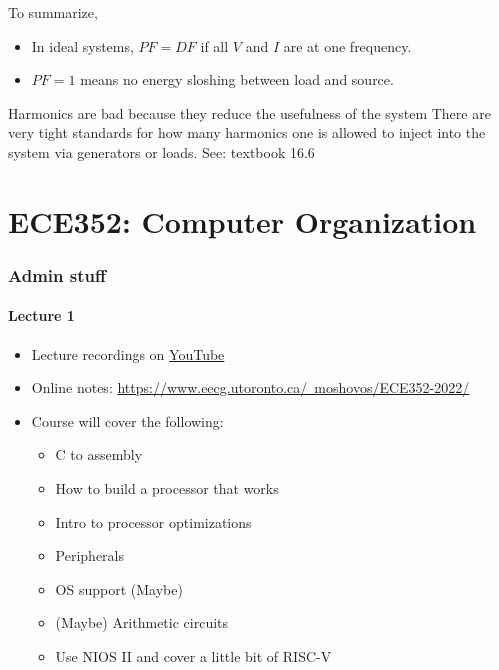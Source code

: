 \documentclass[10pt]{article}
\begin{document}
To summarize, 

\begin{itemize}
	\item In ideal systems, $ PF = DF $ if all $ V $ and $ I $ are at one frequency.
	\item $ PF = 1 $ means no energy sloshing between load and source.
\end{itemize}

Harmonics are bad because they reduce the usefulness of the system
There are very tight standards for how many harmonics one is allowed to inject into the system via generators or loads.
See: textbook 16.6











\part{ECE352: Computer Organization}

\section{Admin stuff}
\subsection{Lecture 1}



\begin{itemize}
	\item Lecture recordings on \href{https://tinyurl.com/2jthyk8k}{YouTube}
	\item Online notes: \href{https://www.eecg.utoronto.ca/~moshovos/ECE352-2022}{https://www.eecg.utoronto.ca/~moshovos/ECE352-2022/}
	\item Course will cover the following:
	 \begin{itemize}
	 	\item C to assembly
		\item How to build a processor that works
		\item Intro to processor optimizations
		\item Peripherals
		\item OS support (Maybe)
		\item (Maybe) Arithmetic circuits
		\item Use NIOS II and cover a little bit of RISC-V
	 \end{itemize}	
\end{itemize}
\end{document}
